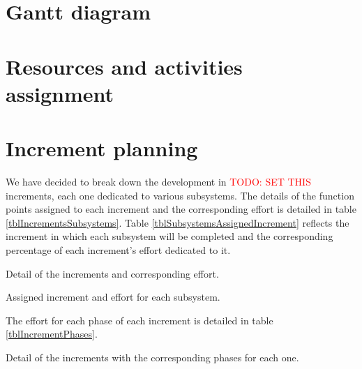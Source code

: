 

\section{Gantt diagram}

\section{Resources and activities assignment}

\section{Increment planning}

We have decided to break down the development in \textcolor{red}{TODO: SET THIS} increments, each one dedicated to various subsystems. The details of the function points assigned to each increment and the corresponding effort is detailed in table \ref{tblIncrementsSubsystems}. Table \ref{tblSubsystemsAssignedIncrement} reflects the increment in which each subsystem will be completed and the corresponding percentage of each increment's effort dedicated to it.

\begin{table}[hbtp]
\centering

\caption{Detail of the increments and corresponding effort.}
\label{tblIncrementsSubsystems}
\end{table}

\begin{table}[hbtp]
\centering

\caption{Assigned increment and effort for each subsystem.}
\label{tblSubsystemsAssignedIncrement}
\end{table}

The effort for each phase of each increment is detailed in table \ref{tblIncrementPhases}.

\begin{table}[hbtp]
\centering

\caption{Detail of the increments with the corresponding phases for each one.}
\label{tblIncrementPhases}
\end{table}
